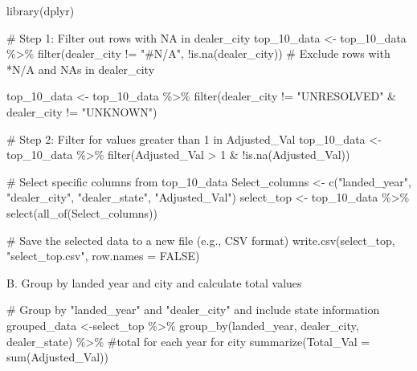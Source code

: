 \documentclass[
  letterpaper,
  DIV=11,
  numbers=noendperiod]{scrartcl}
\newenvironment{Shaded}{\begin{snugshade}}{\end{snugshade}}
\newcommand{\AttributeTok}[1]{\textcolor[rgb]{0.40,0.45,0.13}{#1}}
\newcommand{\CommentTok}[1]{\textcolor[rgb]{0.37,0.37,0.37}{#1}}
\newcommand{\ConstantTok}[1]{\textcolor[rgb]{0.56,0.35,0.01}{#1}}
\newcommand{\DecValTok}[1]{\textcolor[rgb]{0.68,0.00,0.00}{#1}}
\newcommand{\FunctionTok}[1]{\textcolor[rgb]{0.28,0.35,0.67}{#1}}
\newcommand{\NormalTok}[1]{\textcolor[rgb]{0.00,0.23,0.31}{#1}}
\newcommand{\OtherTok}[1]{\textcolor[rgb]{0.00,0.23,0.31}{#1}}
\newcommand{\SpecialCharTok}[1]{\textcolor[rgb]{0.37,0.37,0.37}{#1}}
\newcommand{\StringTok}[1]{\textcolor[rgb]{0.13,0.47,0.30}{#1}}
\begin{document}
\begin{Shaded}
\begin{Highlighting}[]
\FunctionTok{library}\NormalTok{(dplyr)}

\CommentTok{\# Step 1: Filter out rows with NA in dealer\_city}
\NormalTok{top\_10\_data }\OtherTok{\textless{}{-}}\NormalTok{ top\_10\_data }\SpecialCharTok{\%\textgreater{}\%}
  \FunctionTok{filter}\NormalTok{(dealer\_city }\SpecialCharTok{!=} \StringTok{"\#N/A"}\NormalTok{, }\SpecialCharTok{!}\FunctionTok{is.na}\NormalTok{(dealer\_city))  }\CommentTok{\# Exclude rows with *N/A and NAs in dealer\_city}

\NormalTok{top\_10\_data }\OtherTok{\textless{}{-}}\NormalTok{ top\_10\_data }\SpecialCharTok{\%\textgreater{}\%}
  \FunctionTok{filter}\NormalTok{(dealer\_city }\SpecialCharTok{!=} \StringTok{"UNRESOLVED"} \SpecialCharTok{\&}\NormalTok{ dealer\_city }\SpecialCharTok{!=} \StringTok{"UNKNOWN"}\NormalTok{)}


\CommentTok{\# Step 2: Filter for values greater than 1 in Adjusted\_Val}
\NormalTok{top\_10\_data }\OtherTok{\textless{}{-}}\NormalTok{ top\_10\_data }\SpecialCharTok{\%\textgreater{}\%}
  \FunctionTok{filter}\NormalTok{(Adjusted\_Val }\SpecialCharTok{\textgreater{}} \DecValTok{1} \SpecialCharTok{\&} \SpecialCharTok{!}\FunctionTok{is.na}\NormalTok{(Adjusted\_Val))}

\CommentTok{\# Select specific columns from top\_10\_data}
\NormalTok{Select\_columns }\OtherTok{\textless{}{-}} \FunctionTok{c}\NormalTok{(}\StringTok{"landed\_year"}\NormalTok{, }\StringTok{"dealer\_city"}\NormalTok{, }\StringTok{"dealer\_state"}\NormalTok{, }\StringTok{"Adjusted\_Val"}\NormalTok{)}
\NormalTok{select\_top }\OtherTok{\textless{}{-}}\NormalTok{ top\_10\_data }\SpecialCharTok{\%\textgreater{}\%}
  \FunctionTok{select}\NormalTok{(}\FunctionTok{all\_of}\NormalTok{(Select\_columns))}

\CommentTok{\# Save the selected data to a new file (e.g., CSV format)}
\FunctionTok{write.csv}\NormalTok{(select\_top, }\StringTok{"select\_top.csv"}\NormalTok{, }\AttributeTok{row.names =} \ConstantTok{FALSE}\NormalTok{)}
\end{Highlighting}
\end{Shaded}

B. Group by landed year and city and calculate total values

\begin{Shaded}
\begin{Highlighting}[]
\CommentTok{\# Group by "landed\_year" and "dealer\_city" and include state information}
\NormalTok{grouped\_data }\OtherTok{\textless{}{-}}\NormalTok{select\_top }\SpecialCharTok{\%\textgreater{}\%}
  \FunctionTok{group\_by}\NormalTok{(landed\_year, dealer\_city, dealer\_state) }\SpecialCharTok{\%\textgreater{}\%} \CommentTok{\#total for each year for city}
  \FunctionTok{summarize}\NormalTok{(}\AttributeTok{Total\_Val =} \FunctionTok{sum}\NormalTok{(Adjusted\_Val))}
\end{Highlighting}
\end{Shaded}
\end{document}
